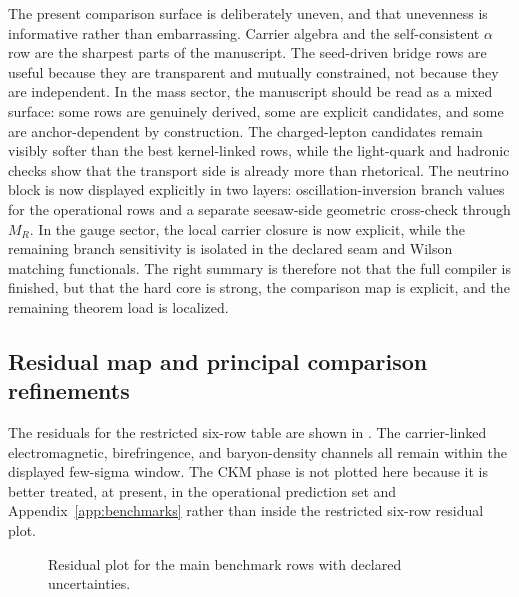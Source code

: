 The present comparison surface is deliberately uneven, and that unevenness is informative rather than embarrassing. Carrier algebra and the self-consistent $\alpha$ row are the sharpest parts of the manuscript. The seed-driven bridge rows are useful because they are transparent and mutually constrained, not because they are independent. In the mass sector, the manuscript should be read as a mixed surface: some rows are genuinely derived, some are explicit candidates, and some are anchor-dependent by construction. The charged-lepton candidates remain visibly softer than the best kernel-linked rows, while the light-quark and hadronic checks show that the transport side is already more than rhetorical. The neutrino block is now displayed explicitly in two layers: oscillation-inversion branch values for the operational rows and a separate seesaw-side geometric cross-check through $M_R$. In the gauge sector, the local carrier closure is now explicit, while the remaining branch sensitivity is isolated in the declared seam and Wilson matching functionals. The right summary is therefore not that the full compiler is finished, but that the hard core is strong, the comparison map is explicit, and the remaining theorem load is localized.

\subsection{Residual map and principal comparison refinements}

The residuals for the restricted six-row table are shown in . The carrier-linked electromagnetic, birefringence, and baryon-density channels all remain within the displayed few-sigma window. The CKM phase is not plotted here because it is better treated, at present, in the operational prediction set and Appendix~\ref{app:benchmarks} rather than inside the restricted six-row residual plot.

\begin{figure}[t]
\centering
{}
\caption{Residual plot for the main benchmark rows with declared uncertainties.}
\label{fig:residual-plot}
\end{figure}

